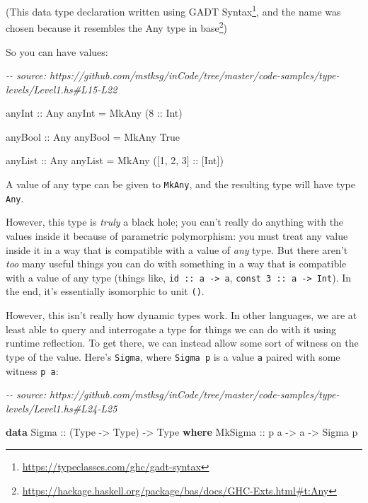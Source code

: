 \documentclass[]{article}
\newenvironment{Shaded}{}{}
\newcommand{\CommentTok}[1]{\textcolor[rgb]{0.38,0.63,0.69}{\textit{#1}}}
\newcommand{\DataTypeTok}[1]{\textcolor[rgb]{0.56,0.13,0.00}{#1}}
\newcommand{\DecValTok}[1]{\textcolor[rgb]{0.25,0.63,0.44}{#1}}
\newcommand{\KeywordTok}[1]{\textcolor[rgb]{0.00,0.44,0.13}{\textbf{#1}}}
\newcommand{\NormalTok}[1]{#1}
\newcommand{\OtherTok}[1]{\textcolor[rgb]{0.00,0.44,0.13}{#1}}
\renewcommand{\href}[2]{#2\footnote{\url{#1}}}
\begin{document}
(This data type declaration written using
\href{https://typeclasses.com/ghc/gadt-syntax}{GADT Syntax}, and the name was
chosen because it resembles
\href{https://hackage.haskell.org/package/bas/docs/GHC-Exts.html\#t:Any}{the Any
type in base})

So you can have values:

\begin{Shaded}
\begin{Highlighting}[]
\CommentTok{{-}{-} source: https://github.com/mstksg/inCode/tree/master/code{-}samples/type{-}levels/Level1.hs\#L15{-}L22}

\OtherTok{anyInt ::} \DataTypeTok{Any}
\NormalTok{anyInt }\OtherTok{=} \DataTypeTok{MkAny}\NormalTok{ (}\DecValTok{8}\OtherTok{ ::} \DataTypeTok{Int}\NormalTok{)}

\OtherTok{anyBool ::} \DataTypeTok{Any}
\NormalTok{anyBool }\OtherTok{=} \DataTypeTok{MkAny} \DataTypeTok{True}

\OtherTok{anyList ::} \DataTypeTok{Any}
\NormalTok{anyList }\OtherTok{=} \DataTypeTok{MkAny}\NormalTok{ ([}\DecValTok{1}\NormalTok{, }\DecValTok{2}\NormalTok{, }\DecValTok{3}\NormalTok{]}\OtherTok{ ::}\NormalTok{ [}\DataTypeTok{Int}\NormalTok{])}
\end{Highlighting}
\end{Shaded}

A value of any type can be given to \texttt{MkAny}, and the resulting type will
have type \texttt{Any}.

However, this type is \emph{truly} a black hole; you can't really do anything
with the values inside it because of parametric polymorphism: you must treat any
value inside it in a way that is compatible with a value of \emph{any} type. But
there aren't \emph{too} many useful things you can do with something in a way
that is compatible with a value of any type (things like,
\texttt{id\ ::\ a\ -\textgreater{}\ a},
\texttt{const\ 3\ ::\ a\ -\textgreater{}\ Int}). In the end, it's essentially
isomorphic to unit \texttt{()}.

However, this isn't really how dynamic types work. In other languages, we are at
least able to query and interrogate a type for things we can do with it using
runtime reflection. To get there, we can instead allow some sort of witness on
the type of the value. Here's \texttt{Sigma}, where \texttt{Sigma\ p} is a value
\texttt{a} paired with some witness \texttt{p\ a}:

\begin{Shaded}
\begin{Highlighting}[]
\CommentTok{{-}{-} source: https://github.com/mstksg/inCode/tree/master/code{-}samples/type{-}levels/Level1.hs\#L24{-}L25}

\KeywordTok{data} \DataTypeTok{Sigma}\OtherTok{ ::}\NormalTok{ (}\DataTypeTok{Type} \OtherTok{{-}\textgreater{}} \DataTypeTok{Type}\NormalTok{) }\OtherTok{{-}\textgreater{}} \DataTypeTok{Type} \KeywordTok{where}
  \DataTypeTok{MkSigma}\OtherTok{ ::}\NormalTok{ p a }\OtherTok{{-}\textgreater{}}\NormalTok{ a }\OtherTok{{-}\textgreater{}} \DataTypeTok{Sigma}\NormalTok{ p}
\end{Highlighting}
\end{Shaded}
\end{document}
